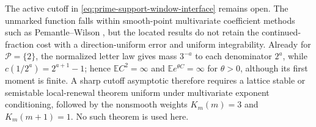 The active cutoff in \eqref{eq:prime-support-window-interface} remains open.
The unmarked function falls within smooth-point multivariate coefficient
methods such as Pemantle--Wilson \cite{PemantleWilson2002}, but the located
results do not retain the continued-fraction cost with a direction-uniform
error and uniform integrability.  Already for \(\mathcal P=\{2\}\), the
normalized letter law gives mass \(3^{-a}\) to each denominator \(2^a\),
while \(c(1/2^a)=2^{a+1}-1\); hence \(\mathbb EC^2=\infty\) and
\(\mathbb Ee^{\theta C}=\infty\) for \(\theta>0\), although its first moment
is finite.  A sharp cutoff asymptotic therefore requires a lattice stable or
semistable local-renewal theorem uniform under multivariate exponent
conditioning, followed by the nonsmooth weights \(K_m(m)=3\) and
\(K_m(m+1)=1\).  No such theorem is used here.

